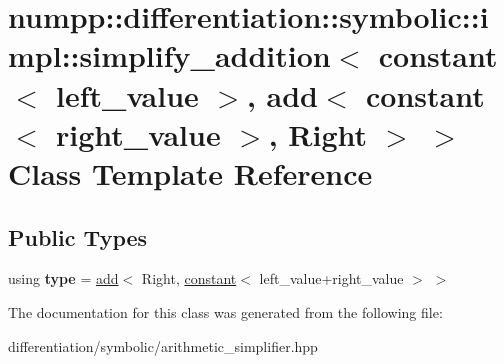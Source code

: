 \hypertarget{classnumpp_1_1differentiation_1_1symbolic_1_1impl_1_1simplify__addition_3_01constant_3_01left__vfa025c621c0342a297dcef4b571ae845}{}\section{numpp\+:\+:differentiation\+:\+:symbolic\+:\+:impl\+:\+:simplify\+\_\+addition$<$ constant$<$ left\+\_\+value $>$, add$<$ constant$<$ right\+\_\+value $>$, Right $>$ $>$ Class Template Reference}
\label{classnumpp_1_1differentiation_1_1symbolic_1_1impl_1_1simplify__addition_3_01constant_3_01left__vfa025c621c0342a297dcef4b571ae845}
\subsection*{Public Types}
\begin{DoxyCompactItemize}
\item 
\mbox{\label{classnumpp_1_1differentiation_1_1symbolic_1_1impl_1_1simplify__addition_3_01constant_3_01left__vfa025c621c0342a297dcef4b571ae845_aaadb1c3b0bfd915fe3e89034a7697559}} 
using {\bfseries type} = \hyperlink{classnumpp_1_1differentiation_1_1symbolic_1_1add}{add}$<$ Right, \hyperlink{classnumpp_1_1differentiation_1_1symbolic_1_1constant}{constant}$<$ left\+\_\+value+right\+\_\+value $>$ $>$
\end{DoxyCompactItemize}


The documentation for this class was generated from the following file\+:\begin{DoxyCompactItemize}
\item 
differentiation/symbolic/arithmetic\+\_\+simplifier.\+hpp\end{DoxyCompactItemize}
